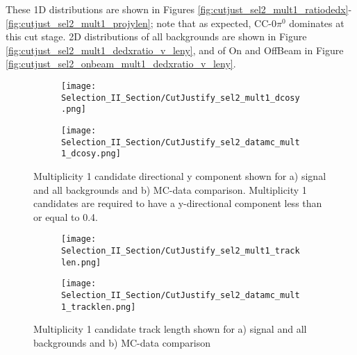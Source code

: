 These 1D distributions are shown in Figures \ref{fig:cutjust_sel2_mult1_ratiodedx}-\ref{fig:cutjust_sel2_mult1_projylen}; note that as expected, CC-0$\pi^0$ dominates at this cut stage. 2D distributions of all backgrounds are shown in Figure \ref{fig:cutjust_sel2_mult1_dedxratio_v_leny}, and of On and OffBeam in Figure \ref{fig:cutjust_sel2_onbeam_mult1_dedxratio_v_leny}.

\begin{figure}[h!]
\centering
  \begin{subfigure}[t]{0.4\textwidth}
    \centering
\texttt{[image: Selection\_II\_Section/CutJustify\_sel2\_mult1\_dcosy.png]}
    \caption{ }
  \end{subfigure} 
  \hspace{20mm}
  \begin{subfigure}[t]{0.4\textwidth}
    \centering
\texttt{[image: Selection\_II\_Section/CutJustify\_sel2\_datamc\_mult1\_dcosy.png]}
    \caption{ }
  \end{subfigure} 
\caption{Multiplicity 1 candidate directional y component shown for a) signal and all backgrounds and b) MC-data comparison.  Multiplicity 1 candidates are required to have a y-directional component less than or equal to 0.4. }
\label{fig:cutjust_sel2_mult1_cosy}
\end{figure}

\begin{figure}[h!]
\centering
  \begin{subfigure}[t]{0.4\textwidth}
    \centering
\texttt{[image: Selection\_II\_Section/CutJustify\_sel2\_mult1\_tracklen.png]}
    \caption{ }
  \end{subfigure} 
  \hspace{20mm}
  \begin{subfigure}[t]{0.4\textwidth}
    \centering
\texttt{[image: Selection\_II\_Section/CutJustify\_sel2\_datamc\_mult1\_tracklen.png]}
    \caption{ }
  \end{subfigure} 
\caption{Multiplicity 1 candidate track length shown for a) signal and all backgrounds and b) MC-data comparison }
\label{fig:cutjust_sel2_mult1_len}
\end{figure}

